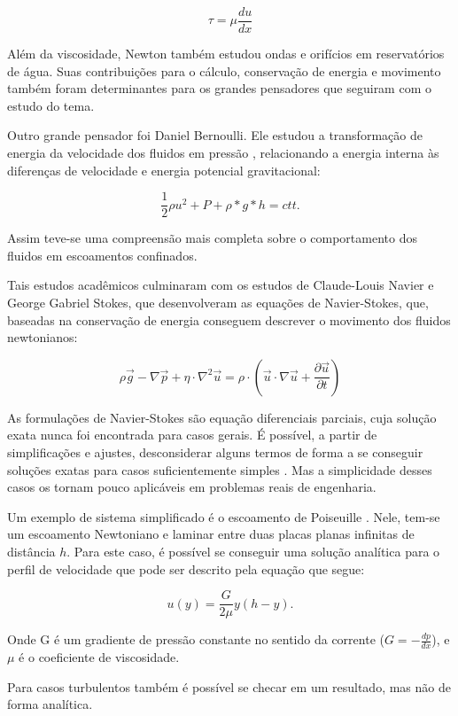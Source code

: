 \begin{equation}
    \tau = \mu \frac{d u}{d x}
\end{equation}

Além da viscosidade, Newton também estudou ondas e orifícios em reservatórios de água. Suas contribuições para o cálculo, conservação de energia e movimento também foram determinantes para os grandes pensadores que seguiram com o estudo do tema.

Outro grande pensador foi Daniel Bernoulli. Ele estudou a transformação de energia da velocidade dos fluidos em pressão \cite{1570009750104671360}, relacionando a energia interna às diferenças de velocidade e energia potencial gravitacional:

\begin{equation}
    \frac{1}{2}\rho u^2 + P + \rho * g * h = ctt.
\end{equation}

Assim teve-se uma compreensão mais completa sobre o comportamento dos fluidos em escoamentos confinados.

Tais estudos acadêmicos culminaram com os estudos de  Claude-Louis Navier e George Gabriel Stokes, que desenvolveram as equações de Navier-Stokes, que, baseadas na conservação de energia conseguem descrever o movimento dos fluidos newtonianos:

\begin{equation}
\rho \vec{g}-\nabla \vec{p}+\eta \cdot \nabla^{2} \vec{u}=\rho \cdot\left(\vec{u} \cdot \nabla \vec{u}+\frac{\partial \vec{u}}{\partial t}\right)
\end{equation}

As formulações de Navier-Stokes são equação diferenciais parciais, cuja solução exata nunca foi encontrada para casos gerais. É possível, a partir de simplificações e ajustes, desconsiderar alguns termos de forma a se conseguir soluções exatas para casos suficientemente simples \cite{Cengel}. Mas a simplicidade desses casos os tornam pouco aplicáveis em problemas reais de engenharia.

Um exemplo de sistema simplificado é o escoamento de Poiseuille \cite{Poiseuille}. Nele, tem-se um escoamento Newtoniano e laminar entre duas placas planas infinitas de distância $h$. Para este caso, é possível se conseguir uma solução analítica para o perfil de velocidade que pode ser descrito pela equação que segue:

\begin{equation}
  u(y) = \frac{G}{2\mu}y (h - y).
\end{equation}

Onde G é um gradiente de pressão constante no sentido da corrente ($G = -\frac{dp}{dx}$), e $\mu$ é o coeficiente de viscosidade.

Para casos turbulentos também é possível se checar em um resultado, mas não de forma analítica.
